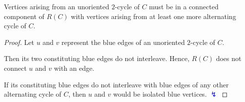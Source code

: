 \documentclass{beamer}
\theoremstyle{definition}
\def\b{\textcolor{blue}}
\begin{document}
\begin{frame}

\begin{lemma}
\label{lem:7}
Vertices arising from an unoriented $2$-cycle of $C$ must be in a connected component of $R(C)$ with vertices arising from at least one more alternating cycle of $C$.
\end{lemma}

\begin{center}
\end{center}\pause

\begin{proof}
Let $u$ and $v$ represent the blue edges of an unoriented $2$-cycle of $C$. \par\pause
Then its two constituting blue edges do not interleave. Hence, $R(C)$ does not connect $u$ and $v$ with an edge. \par\pause
If its constituting blue edges do not interleave with blue edges of any other alternating cycle of $C$, then $u$ and $v$ would be isolated blue vertices. \b{$\lightning$}
\end{proof}

\end{frame}
\end{document}
